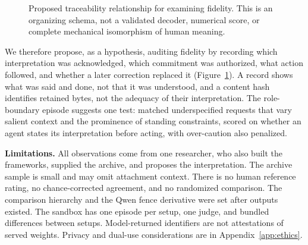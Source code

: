 \documentclass[11pt]{article}
\begin{document}
\begin{figure}[htbp]
\centering
{}
\caption{Proposed traceability relationship for examining fidelity. This is an organizing schema, not a validated decoder, numerical score, or complete mechanical isomorphism of human meaning.}
\label{fig:trace}
\end{figure}

We therefore propose, as a hypothesis, auditing fidelity by recording which interpretation was acknowledged, which commitment was authorized, what action followed, and whether a later correction replaced it (Figure~\ref{fig:trace}). A record shows what was said and done, not that it was understood, and a content hash identifies retained bytes, not the adequacy of their interpretation. The role-boundary episode suggests one test: matched underspecified requests that vary salient context and the prominence of standing constraints, scored on whether an agent states its interpretation before acting, with over-caution also penalized.

\textbf{Limitations.} All observations come from one researcher, who also built the frameworks, supplied the archive, and proposes the interpretation. The archive sample is small and may omit attachment context. There is no human reference rating, no chance-corrected agreement, and no randomized comparison. The comparison hierarchy and the Qwen fence derivative were set after outputs existed. The sandbox has one episode per setup, one judge, and bundled differences between setups. Model-returned identifiers are not attestations of served weights. Privacy and dual-use considerations are in Appendix~\ref{app:ethics}.
\end{document}
